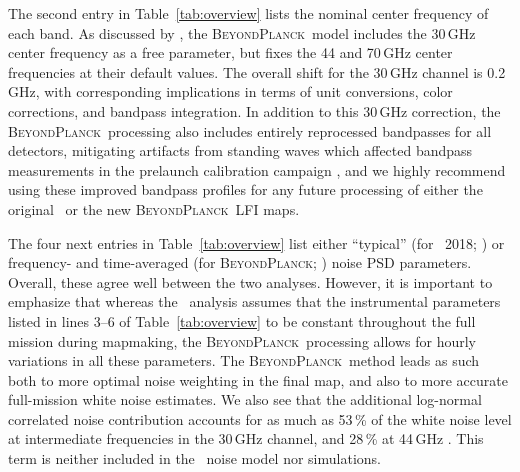 \documentclass[twocolumn]{aa}
\newcommand{\BP}{\textsc{BeyondPlanck}}
\begin{document}
The second entry in Table~\ref{tab:overview} lists the nominal center
frequency of each band. As discussed by \citet{bp09}, the \BP\ model
includes the 30\,GHz center frequency as a free parameter, but fixes
the 44 and 70\,GHz center frequencies at their default values. The
overall shift for the 30\,GHz channel is 0.2\,GHz, with
corresponding implications in terms of unit conversions, color
corrections, and bandpass integration. In addition to this 30\,GHz
correction, the \BP\ processing also includes
entirely reprocessed bandpasses for all detectors, mitigating artifacts
from standing waves which affected bandpass measurements 
in the prelaunch calibration campaign \citep{zonca2009,bp09}, 
and we highly recommend using these improved
bandpass profiles for any future processing of either the original
\Planck\ or the new \BP\ LFI maps.

The four next entries in Table~\ref{tab:overview} list either
``typical'' (for \Planck\ 2018; \citealp{planck2016-l02}) or
frequency- and time-averaged (for \BP; \citealp{bp06}) noise PSD
parameters. Overall, these agree well between the two
analyses. However, it is important to emphasize that whereas the
\Planck\ analysis assumes that the instrumental parameters listed in
lines 3--6 of Table~\ref{tab:overview} to be constant throughout the
full mission during mapmaking, the \BP\ processing allows for hourly
variations in all these parameters. The \BP\ method leads as such both
to more optimal noise weighting in the final map, and also to more
accurate full-mission white noise estimates. We also see that the
additional log-normal correlated noise contribution accounts for as
much as 53\,\% of the white noise level at intermediate frequencies in
the 30\,GHz channel, and 28\,\% at 44\,GHz \citep{bp06}. This term is
neither included in the \Planck\ noise model nor simulations.
\end{document}
